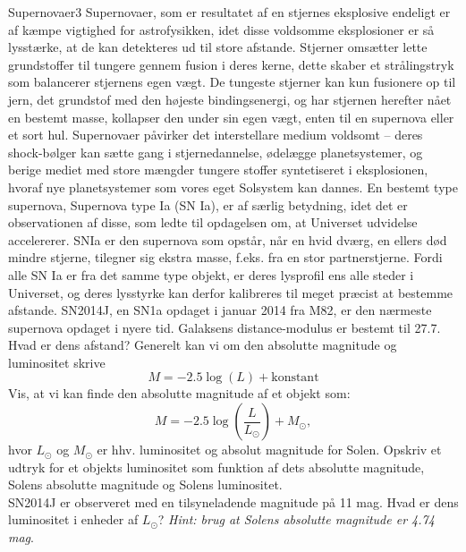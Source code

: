 \begin{opgave}{Supernovaer}{3}
Supernovaer, som er resultatet af en stjernes eksplosive endeligt er af kæmpe vigtighed for astrofysikken, idet disse voldsomme eksplosioner er så lysstærke, at de kan detekteres ud til store afstande. Stjerner omsætter lette grundstoffer til tungere gennem fusion i deres kerne, dette skaber et strålingstryk som balancerer stjernens egen vægt. De tungeste stjerner kan kun fusionere op til jern, det grundstof med den højeste bindingsenergi, og har stjernen herefter nået en bestemt masse, kollapser den under sin egen vægt, enten til en supernova eller et sort hul. Supernovaer påvirker det interstellare medium voldsomt -- deres shock-bølger kan sætte gang i stjernedannelse, ødelægge planetsystemer, og berige mediet med store mængder tungere stoffer syntetiseret i eksplosionen, hvoraf nye planetsystemer som vores eget Solsystem kan dannes. En bestemt type supernova, Supernova type Ia (SN Ia), er af særlig betydning, idet det er observationen af disse, som ledte til opdagelsen om, at Universet udvidelse accelererer. SNIa er den supernova som opstår, når en hvid dværg, en ellers død mindre stjerne, tilegner sig ekstra masse, f.eks. fra en stor partnerstjerne. Fordi alle SN Ia er fra det samme type objekt, er deres lysprofil ens alle steder i Universet, og deres lysstyrke kan derfor kalibreres til meget præcist at bestemme afstande.
\opg SN2014J, en SN1a opdaget i januar 2014 fra M82, er den nærmeste supernova opdaget i nyere tid. Galaksens distance-modulus er bestemt til 27.7. Hvad er dens afstand?
\opg Generelt kan vi om den absolutte magnitude og luminositet skrive
\begin{equation}
M = -2.5 \log (L) + \text{konstant}
\end{equation}
Vis, at vi kan finde den absolutte magnitude af et objekt som:
\begin{equation}
M = -2.5 \log \left( \frac{L}{L_\odot} \right) + M_\odot,
\label{eq:astro_M}
\end{equation}
hvor $L_\odot$ og $M_\odot$ er hhv. luminositet og absolut magnitude for Solen. 
\opg Opskriv et udtryk for et objekts luminositet som funktion af dets absolutte magnitude, Solens absolutte magnitude og Solens luminositet.\\
\opg SN2014J er observeret med en tilsyneladende magnitude på 11 mag. Hvad er dens luminositet i enheder af $L_\odot$? \emph{Hint: brug at Solens absolutte magnitude er 4.74 mag}. 
\end{opgave}




